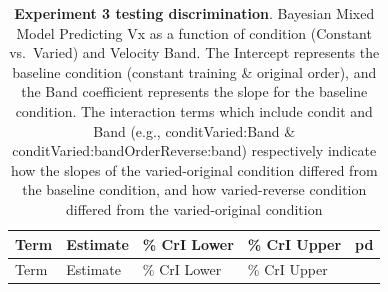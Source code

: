 \documentclass[
  11pt,
  letterpaper,
]{article}
\begin{document}
\begin{longtable}[]{@{}
  >{\raggedright\arraybackslash}p{}
  >{\raggedleft\arraybackslash}p{}
  >{\raggedleft\arraybackslash}p{}
  >{\raggedleft\arraybackslash}p{}
  >{\raggedleft\arraybackslash}p{}@{}}
\caption{\textbf{Experiment 3 testing discrimination}. Bayesian Mixed
Model Predicting Vx as a function of condition (Constant vs.~Varied) and
Velocity Band. The Intercept represents the baseline condition (constant
training \& original order), and the Band coefficient represents the
slope for the baseline condition. The interaction terms which include
condit and Band (e.g., conditVaried:Band \&
conditVaried:bandOrderReverse:band) respectively indicate how the slopes
of the varied-original condition differed from the baseline condition,
and how varied-reverse condition differed from the varied-original
condition}\label{tbl-e3-bmm-vx}\tabularnewline
\toprule\noalign{}
\begin{minipage}[b]{\linewidth}\raggedright
Term
\end{minipage} & \begin{minipage}[b]{\linewidth}\raggedleft
Estimate
\end{minipage} & \begin{minipage}[b]{\linewidth}\raggedleft
95\% CrI Lower
\end{minipage} & \begin{minipage}[b]{\linewidth}\raggedleft
95\% CrI Upper
\end{minipage} & \begin{minipage}[b]{\linewidth}\raggedleft
pd
\end{minipage} \\
\midrule\noalign{}
\endfirsthead
\toprule\noalign{}
\begin{minipage}[b]{\linewidth}\raggedright
Term
\end{minipage} & \begin{minipage}[b]{\linewidth}\raggedleft
Estimate
\end{minipage} & \begin{minipage}[b]{\linewidth}\raggedleft
95\% CrI Lower
\end{minipage} & \begin{minipage}[b]{\linewidth}\raggedleft
95\% CrI Upper
\end{minipage} & \begin{minipage}[b]{\linewidth}\raggedleft

\end{minipage}
\end{longtable}
\end{document}

